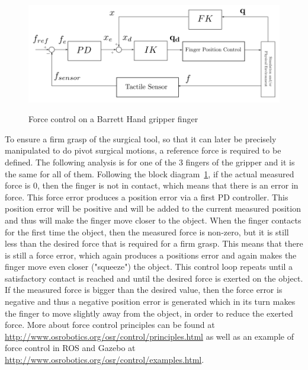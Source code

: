 \begin{center}
\begin{figure}[htbp]
\centering
\includegraphics[width=12cm]{images/finger-force-control.png}\\
\caption{Force control on a Barrett Hand gripper finger}
\label{finger-force-control}
\end{figure}
\end{center}

To ensure a firm grasp of the surgical tool, so that it can later be precisely manipulated to do pivot surgical motions, a reference force is required to be defined. The following analysis is for one of the 3 fingers of the gripper and it is the same for all of them. Following the block diagram~\ref{finger-force-control}, if the actual measured force is 0, then the finger is not in contact, which means that there is an error in force. This force error produces a position error via a first PD controller. This position error will be positive and will be added to the current measured position and thus will make the finger move closer to the object. When the finger contacts for the first time the object, then the measured force is non-zero, but it is still less than the desired force that is required for a firm grasp. This means that there is still a force error, which again produces a positions error and again makes the finger move even closer ("squeeze") the object. This control loop repeats until a satisfactory contact is reached and until the desired force is exerted on the object. If the measured force is bigger than the desired value, then the force error is negative and thus a negative position error is generated which in its turn makes the finger to move slightly away from the object, in order to reduce the exerted force. More about force control principles can be found at \url{http://www.osrobotics.org/osr/control/principles.html} as well as an example of force control in ROS and Gazebo at \url{http://www.osrobotics.org/osr/control/examples.html}.